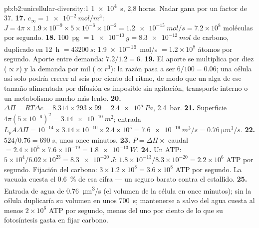\begin{solution}{pb:b2:unicellular-diversity:1}
\qty{1e4}{s}, 2,8 horas. Nadar gana por un factor de 37.
\textbf{17.} $c_\infty = \qty{1e-2}{mol/m^3}$: $J = 4\pi\times
1.9\times 10^{-9}\times 5\times 10^{-6}\times 10^{-2} =
\qty{1.2e-15}{mol/s} = 7.2\times 10^8$ moléculas por segundo.
\textbf{18.} \qty{100}{pg} $= \qty{1e-10}{g} = \qty{8.3e-12}{mol}$ de
carbono, duplicado en \qty{12}{h} $= \qty{43200}{s}$:
\qty{1.9e-16}{mol/s} $= 1.2\times 10^8$ átomos por segundo. Aporte
entre demanda: $7.2/1.2 = 6$.
\textbf{19.} El aporte se multiplica por diez ($\propto r$) y la demanda
por mil ($\propto r^3$): la razón pasa a ser $6/100 = 0.06$; una célula
así solo podría crecer al seis por ciento del ritmo, de modo que un alga
de ese tamaño alimentada por difusión es imposible sin agitación,
transporte interno o un metabolismo mucho más lento.
\textbf{20.} $\Delta\Pi = RT\Delta c = 8.314\times 293\times 99 =
\qty{2.4e5}{Pa}$, \qty{2.4}{bar}.
\textbf{21.} Superficie $4\pi(5\times 10^{-6})^2 = \qty{3.14e-10}{m^2}$;
entrada $L_p A\Delta\Pi = 10^{-14}\times 3.14\times 10^{-10}\times
2.4\times 10^5 = \qty{7.6e-19}{m^3/s} = \qty{0.76}{\micro m^3/s}$.
\textbf{22.} $524/0.76 = \qty{690}{s}$, unos once minutos.
\textbf{23.} $P = \Delta\Pi\times$ caudal $= 2.4\times 10^5\times
7.6\times 10^{-19} = \qty{1.8e-13}{W}$.
\textbf{24.} Un ATP: $5\times 10^4/6.02\times 10^{23} =
\qty{8.3e-20}{J}$: $1.8\times 10^{-13}/8.3\times 10^{-20} = 2.2\times
10^6$ ATP por segundo. Fijación del carbono: $3\times 1.2\times 10^8 =
3.6\times 10^8$ ATP por segundo. La vacuola cuesta el \qty{0.6}{\%} de
esa cifra --- un seguro barato contra el estallido.
\textbf{25.} Entrada de agua de \qty{0.76}{\micro m^3/s} (el volumen de
la célula en once minutos); sin  la célula duplicaría
su volumen en unos \qty{700}{s}; mantenerse a salvo del agua cuesta al
menos $2\times 10^6$ ATP por segundo, menos del uno por ciento de lo que
su fotosíntesis gasta en fijar carbono.
\end{solution}
